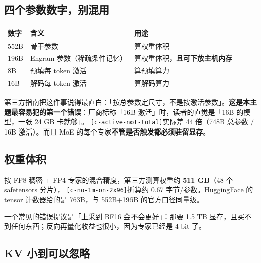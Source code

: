 \subsection{四个参数数字，别混用}

\begin{table}[t]
\centering
\footnotesize
\setlength{\tabcolsep}{4pt}
\label{tab:1}
\begin{tabular}{lll}
\toprule
数字 & 含义 & 用途 \\
\midrule
552B & 骨干参数 & 算权重体积 \\
196B & Engram 参数（稀疏条件记忆） & 算权重体积，\textbf{且可下放主机内存} \\
8B & 预填每 token 激活 & 算预填算力 \\
16B & 解码每 token 激活 & 算解码算力 \\
\bottomrule
\end{tabular}
\end{table}

第三方指南把这件事说得最直白：「按总参数定尺寸，不是按激活参数」。\textbf{这是本主题最容易犯的第一个错误}：厂商标称「16B 激活」时，读者的直觉是「16B 的模型，一张 24 GB 卡就够」。 {\scriptsize\texttt{[c-\hspace{0pt}active-\hspace{0pt}not-\hspace{0pt}total]}}实际差 44 倍（748B 总参数 / 16B 激活）。而且 MoE 的每个专家\textbf{不管是否触发都必须驻留显存}。


\subsection{权重体积}

按 FP8 稠密 + FP4 专家的混合精度，第三方测算权重约 \textbf{511 GB}（48 个 safetensors 分片）， {\scriptsize\texttt{[c-\hspace{0pt}no-\hspace{0pt}1m-\hspace{0pt}on-\hspace{0pt}2x96]}}折算约 0.67 字节/参数。HuggingFace 的 tensor 计数器给的是 763B，与 552B+196B 的官方口径同量级。


一个常见的错误提议是「上采到 BF16 会不会更好」：那要 1.5 TB 显存，且买不到任何东西；反向再量化收益也很小，因为专家已经是 4-bit 了。


\subsection{KV 小到可以忽略}

